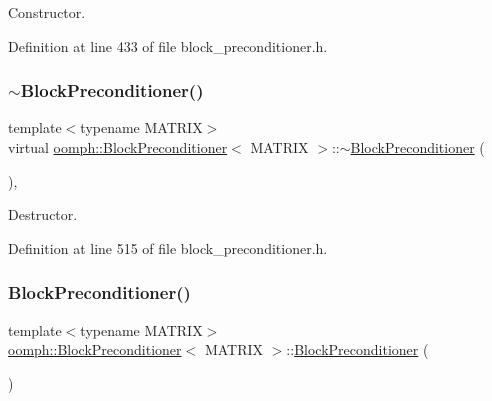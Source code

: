 Constructor. 



Definition at line 433 of file block\+\_\+preconditioner.\+h.

\mbox{\label{classoomph_1_1BlockPreconditioner_a78c33fc6f29101f027e22d64d158d567}} 
\subsubsection{\texorpdfstring{$\sim$\+Block\+Preconditioner()}{~BlockPreconditioner()}}
{\footnotesize\ttfamily template$<$typename M\+A\+T\+R\+IX$>$ \\
virtual \hyperlink{classoomph_1_1BlockPreconditioner}{oomph\+::\+Block\+Preconditioner}$<$ M\+A\+T\+R\+IX $>$\+::$\sim$\hyperlink{classoomph_1_1BlockPreconditioner}{Block\+Preconditioner} (\begin{DoxyParamCaption}{ }\end{DoxyParamCaption})\hspace{0.3cm}{\ttfamily [inline]}, {\ttfamily [virtual]}}



Destructor. 



Definition at line 515 of file block\+\_\+preconditioner.\+h.

\mbox{\label{classoomph_1_1BlockPreconditioner_a9652c8d4fb3cdbd8216f13c356324170}} 
\subsubsection{\texorpdfstring{Block\+Preconditioner()}{BlockPreconditioner()}\hspace{0.1cm}{\footnotesize\ttfamily [2/2]}}
{\footnotesize\ttfamily template$<$typename M\+A\+T\+R\+IX$>$ \\
\hyperlink{classoomph_1_1BlockPreconditioner}{oomph\+::\+Block\+Preconditioner}$<$ M\+A\+T\+R\+IX $>$\+::\hyperlink{classoomph_1_1BlockPreconditioner}{Block\+Preconditioner} (\begin{DoxyParamCaption}\item[{const \hyperlink{classoomph_1_1BlockPreconditioner}{Block\+Preconditioner}$<$ M\+A\+T\+R\+IX $>$ \&}]{ }\end{DoxyParamCaption})\hspace{0.3cm}{\ttfamily [inline]}}



